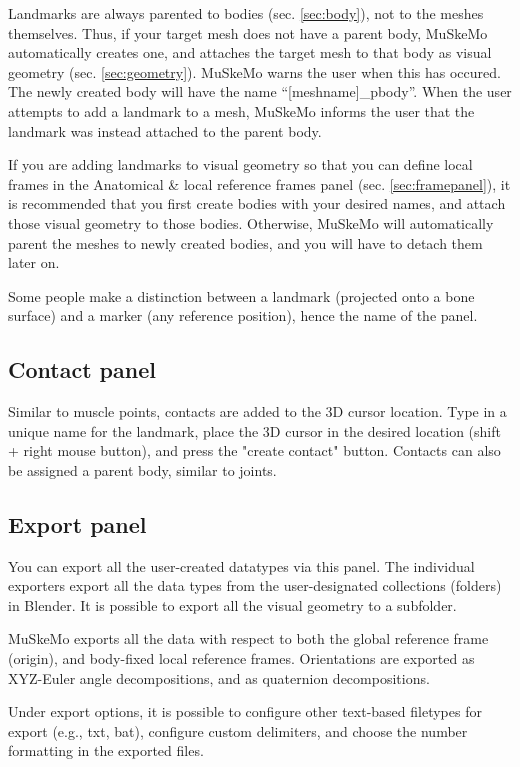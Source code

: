 \documentclass{article}
\begin{document}
Landmarks are always parented to bodies (sec. \ref{sec:body}), not to the meshes themselves. Thus, if your target mesh does not have a parent body, MuSkeMo automatically creates one, and attaches the target mesh to that body as visual geometry (sec. \ref{sec:geometry}). MuSkeMo warns the user when this has occured. The newly created body will have the name ``[meshname]\_pbody''. When the user attempts to add a landmark to a mesh, MuSkeMo informs the user that the landmark was instead attached to the parent body.

If you are adding landmarks to visual geometry so that you can define local frames in the Anatomical \& local reference frames panel (sec. \ref{sec:framepanel}), it is recommended that you first create bodies with your desired names, and attach those visual geometry to those bodies. Otherwise, MuSkeMo will automatically parent the meshes to newly created bodies, and you will have to detach them later on.

Some people make a distinction between a landmark (projected onto a bone surface) and a marker (any reference position), hence the name of the panel.


\subsection{Contact panel}
\label{sec:contactpanel}
Similar to muscle points, contacts are added to the 3D cursor location. Type in a unique name for the landmark, place the 3D cursor in the desired location (shift + right mouse button), and press the "create contact" button. Contacts can also be assigned a parent body, similar to joints.

\subsection{Export panel}
\label{sec:exportpanel}
You can export all the user-created datatypes via this panel. The individual exporters export all the data types from the user-designated collections (folders) in Blender. It is possible to export all the visual geometry to a subfolder.

MuSkeMo exports all the data with respect to both the global reference frame (origin), and body-fixed local reference frames. Orientations are exported as XYZ-Euler angle decompositions, and as quaternion decompositions.

Under export options, it is possible to configure other text-based filetypes for export (e.g., txt, bat), configure custom delimiters, and choose the number formatting in the exported files.
\end{document}
